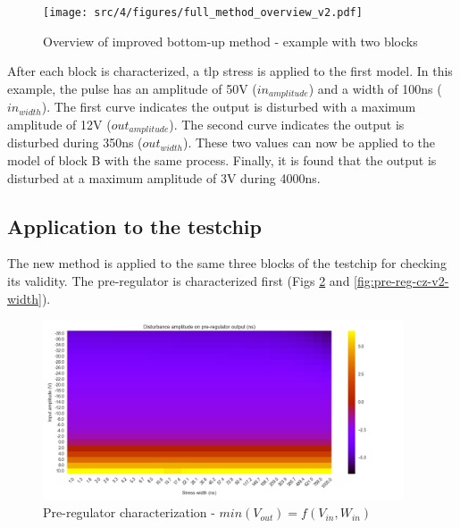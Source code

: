 \begin{figure}[!hp]
  \centering
  \texttt{[image: src/4/figures/full\_method\_overview\_v2.pdf]}
  \caption{Overview of improved bottom-up method - example with two blocks}
  \label{fig:full-method-v2}
\end{figure}

After each block is characterized, a \gls{tlp} stress is applied to the first model.
In this example, the pulse has an amplitude of 50V ($in_{amplitude}$) and a width of 100ns ($in_{width}$).
The first curve indicates the output is disturbed with a maximum amplitude of 12V ($out_{amplitude}$).
The second curve indicates the output is disturbed during 350ns ($out_{width}$).
These two values can now be applied to the model of block B with the same process.
Finally, it is found that the output is disturbed at a maximum amplitude of 3V during 4000ns.

\subsection{Application to the testchip}

The new method is applied to the same three blocks of the testchip for checking its validity.
The pre-regulator is characterized first (Figs \ref{fig:pre-reg-cz-v2-amp} and \ref{fig:pre-reg-cz-v2-width}).

\begin{figure}[!h]
  \centering
  \includegraphics[width=0.95\textwidth]{src/4/figures/vpre_cz_V2_amplitude.png}
  \caption{Pre-regulator characterization - $min(V_{out}) = f(V_{in}, W_{in})$}
  \label{fig:pre-reg-cz-v2-amp}
\end{figure}

